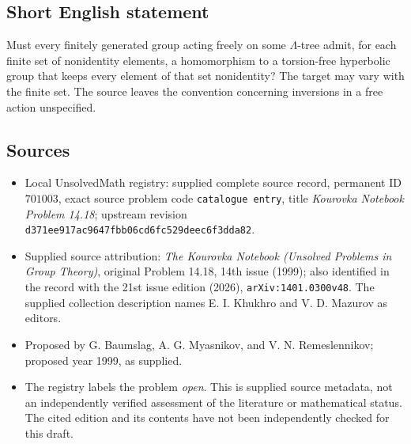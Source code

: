 \documentclass[11pt]{article}
\begin{document}
\subsection{Short English statement}
Must every finitely generated group acting freely on some \(\Lambda\)-tree admit, for each finite set of nonidentity elements, a homomorphism to a torsion-free hyperbolic group that keeps every element of that set nonidentity? The target may vary with the finite set. The source leaves the convention concerning inversions in a free action unspecified.
\subsection{Sources}
\begin{itemize}
\item Local UnsolvedMath registry: supplied complete source record, permanent ID \(701003\), exact source problem code \texttt{catalogue entry}, title \emph{Kourovka Notebook Problem 14.18}; upstream revision \texttt{d371ee917ac9647fbb06cd6fc529deec6f3dda82}.
\item Supplied source attribution: \emph{The Kourovka Notebook (Unsolved Problems in Group Theory)}, original Problem 14.18, 14th issue (1999); also identified in the record with the 21st issue edition (2026), \texttt{arXiv:1401.0300v48}. The supplied collection description names E. I. Khukhro and V. D. Mazurov as editors.
\item Proposed by G. Baumslag, A. G. Myasnikov, and V. N. Remeslennikov; proposed year 1999, as supplied.
\item The registry labels the problem \emph{open}. This is supplied source metadata, not an independently verified assessment of the literature or mathematical status. The cited edition and its contents have not been independently checked for this draft.
\end{itemize}
\end{document}
